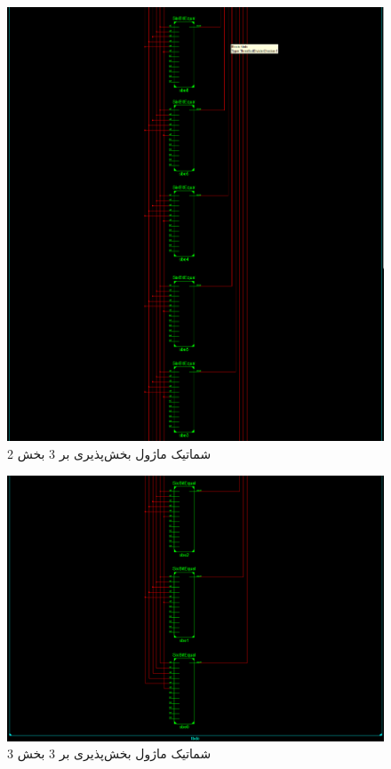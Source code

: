 \documentclass[fleqn]{article}
\begin{document}
\begin{figure}[H]
	\centering
	\includegraphics[width=.5\paperwidth]{./Schematic/TBDC2.png}
	\caption{شماتیک ماژول بخش‌پذیری بر 3 بخش 2}
	\label{tbdc32}
\end{figure}

\begin{figure}[H]
	\centering
	\includegraphics[width=.5\paperwidth]{./Schematic/TBDC3.png}
	\caption{شماتیک ماژول بخش‌پذیری بر 3 بخش 3}
	\label{tbdc33}
\end{figure}
\end{document}

